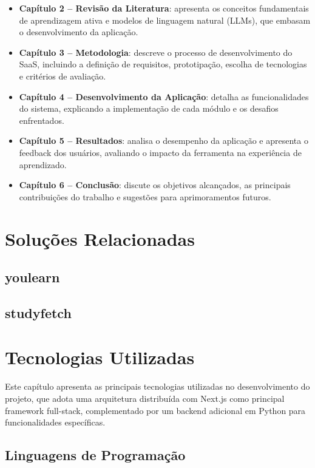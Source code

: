 \documentclass[tcc,capa]{texufpel}
\begin{document}
\begin{itemize}
    \item \textbf{Capítulo 2 – Revisão da Literatura}: apresenta os conceitos fundamentais de aprendizagem ativa e modelos de linguagem natural (LLMs), que embasam o desenvolvimento da aplicação.  
    \item \textbf{Capítulo 3 – Metodologia}: descreve o processo de desenvolvimento do SaaS, incluindo a definição de requisitos, prototipação, escolha de tecnologias e critérios de avaliação.  
    \item \textbf{Capítulo 4 – Desenvolvimento da Aplicação}: detalha as funcionalidades do sistema, explicando a implementação de cada módulo e os desafios enfrentados.  
    \item \textbf{Capítulo 5 – Resultados}: analisa o desempenho da aplicação e apresenta o feedback dos usuários, avaliando o impacto da ferramenta na experiência de aprendizado.  
    \item \textbf{Capítulo 6 – Conclusão}: discute os objetivos alcançados, as principais contribuições do trabalho e sugestões para aprimoramentos futuros.  
\end{itemize}




\chapter{Soluções Relacionadas}
\section{youlearn}
\section{studyfetch}



\chapter{Tecnologias Utilizadas}
Este capítulo apresenta as principais tecnologias utilizadas no desenvolvimento do projeto, que adota uma arquitetura distribuída com Next.js como principal framework full-stack, complementado por um backend adicional em Python para funcionalidades específicas.

\section{Linguagens de Programação}
\end{document}
